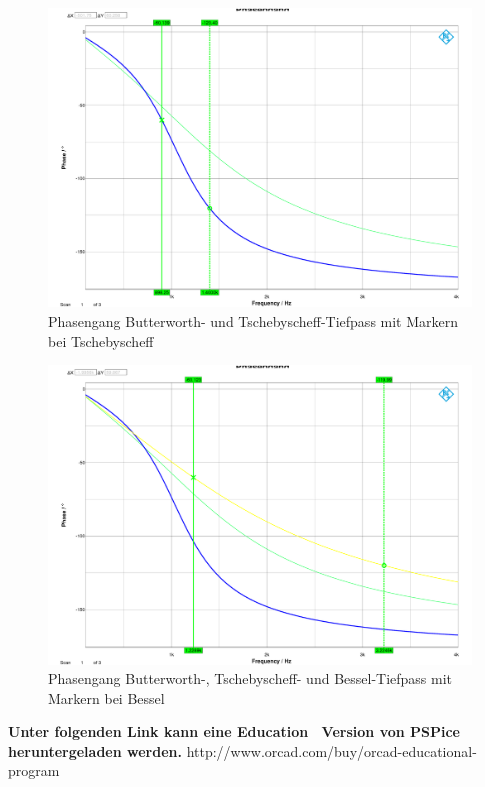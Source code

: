 \begin{figure}[h]
\centering
\includegraphics[width=0.65\linewidth]{Bilder/ImLabor/Phasengang_4_2_Tscheby_TP}
\caption{Phasengang Butterworth- und Tschebyscheff-Tiefpass mit Markern bei Tschebyscheff}
\label{fig:Phasengang_4_2_Tscheby_TP}
\end{figure}

\begin{figure}[h]
\centering
\includegraphics[width=0.65\linewidth]{Bilder/ImLabor/Phasengang_4_3_Bessel_TP_Alle}
\caption{Phasengang Butterworth-, Tschebyscheff- und Bessel-Tiefpass mit Markern bei Bessel}
\label{fig:Phasengang_4_3_Bessel_TP_Alle}
\end{figure}






\noindent \textbf{Unter folgenden Link kann eine \glqq Education\grqq~ Version von PSPice heruntergeladen werden.}
http://www.orcad.com/buy/orcad-educational-program


